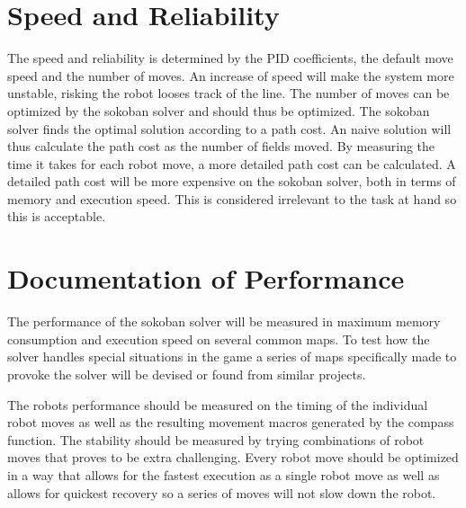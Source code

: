\documentclass[a4paper,10pt]{article}
\begin{document}
\section{Speed and Reliability}
The speed and reliability is determined by the PID coefficients, the default move speed and the number of moves.
An increase of speed will make the system more unstable, risking the robot looses track of the line.
The number of moves can be optimized by the sokoban solver and should thus be optimized.
The sokoban solver finds the optimal solution according to a path cost.
An naive solution will thus calculate the path cost as the number of fields moved.
By measuring the time it takes for each robot move, a more detailed path cost can be calculated.
A detailed path cost will be more expensive on the sokoban solver, both in terms of memory and execution speed.
This is considered irrelevant to the task at hand so this is acceptable.

\section{Documentation of Performance}
The performance of the sokoban solver will be measured in maximum memory consumption and execution speed on several common maps.
To test how the solver handles special situations in the game a series of maps specifically made to provoke the solver will be devised or found from similar projects.

The robots performance should be measured on the timing of the individual robot moves as well as the resulting movement macros generated by the compass function.
The stability should be measured by trying combinations of robot moves that proves to be extra challenging.
Every robot move should be optimized in a way that allows for the fastest execution as a single robot move as well as allows for quickest recovery so a series of moves will not slow down the robot.
\end{document}
